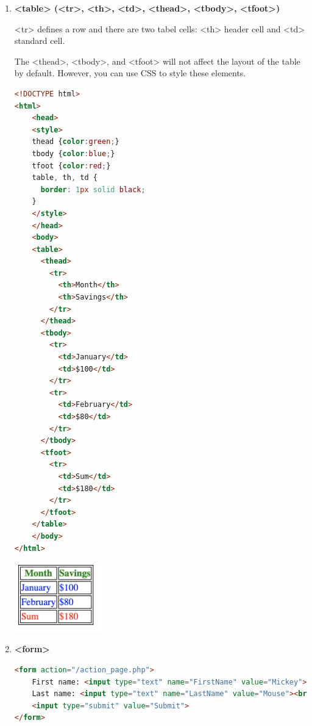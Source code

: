 \documentclass[12pt, a4paper]{report}
\begin{document}
\begin{enumerate}
        
        \item \textbf{<table> (<tr>, <th>, <td>, <thead>, <tbody>, <tfoot>)} \par 
        <tr> defines a row and there are two tabel cells: <th> header cell and <td> standard cell. \par 
        The <thead>, <tbody>, and <tfoot> will not affect the layout of the table by default. However, you can use CSS to style these elements.
        \begin{lstlisting}[language=HTML, caption=table.html]
<!DOCTYPE html>
<html>
    <head>
    <style>
    thead {color:green;}
    tbody {color:blue;}
    tfoot {color:red;}
    table, th, td {
      border: 1px solid black;
    }
    </style>
    </head>
    <body>
    <table>
      <thead>
        <tr>
          <th>Month</th>
          <th>Savings</th>
        </tr>
      </thead>
      <tbody>
        <tr>
          <td>January</td>
          <td>$100</td>
        </tr>
        <tr>
          <td>February</td>
          <td>$80</td>
        </tr>
      </tbody>
      <tfoot>
        <tr>
          <td>Sum</td>
          <td>$180</td>
        </tr>
      </tfoot>
    </table>
    </body>
</html>
        \end{lstlisting}
        \includegraphics[width=0.3\textwidth]{imgs/html_table.png}
        
        \item \textbf{<form>}
        \begin{lstlisting}[language=HTML]
<form action="/action_page.php">
    First name: <input type="text" name="FirstName" value="Mickey"><br>
    Last name: <input type="text" name="LastName" value="Mouse"><br>
    <input type="submit" value="Submit">
</form>
        \end{lstlisting}
        

\end{enumerate}
\end{document}
